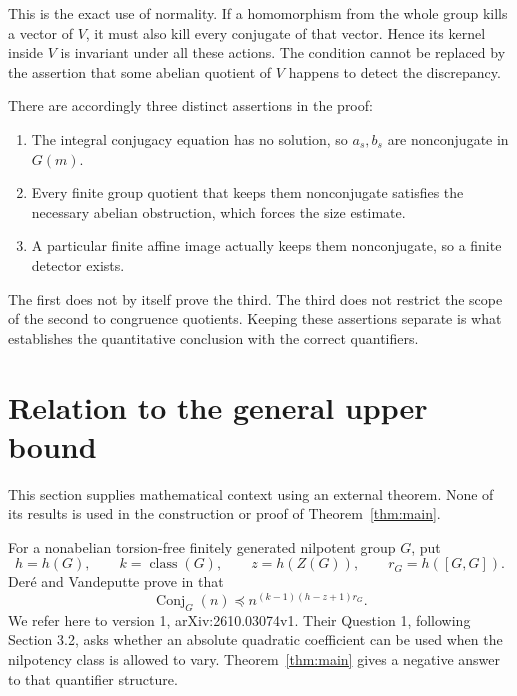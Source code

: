 \documentclass[11pt]{article}
\numberwithin{equation}{section}
\theoremstyle{definition}
\theoremstyle{remark}
\newcommand{\Conj}{\operatorname{Conj}}
\begin{document}
This is the exact use of normality. If a homomorphism from the whole group kills a vector of $V$, it must also kill every conjugate of that vector. Hence its kernel inside $V$ is invariant under all these actions. The condition cannot be replaced by the assertion that some abelian quotient of $V$ happens to detect the discrepancy.

There are accordingly three distinct assertions in the proof:
\begin{enumerate}
\item The integral conjugacy equation has no solution, so $a_s,b_s$ are nonconjugate in $G(m)$.
\item Every finite group quotient that keeps them nonconjugate satisfies the necessary abelian obstruction, which forces the size estimate.
\item A particular finite affine image actually keeps them nonconjugate, so a finite detector exists.
\end{enumerate}
The first does not by itself prove the third. The third does not restrict the scope of the second to congruence quotients. Keeping these assertions separate is what establishes the quantitative conclusion with the correct quantifiers.

\section{Relation to the general upper bound}\label{sec:context}
This section supplies mathematical context using an external theorem. None of its results is used in the construction or proof of Theorem~\ref{thm:main}.

For a nonabelian torsion-free finitely generated nilpotent group $G$, put
\[
h=h(G),\qquad k=\operatorname{class}(G),\qquad
z=h(Z(G)),\qquad r_G=h([G,G]).
\]
Der\'e and Vandeputte prove in \cite[Theorem A]{DV} that
\begin{equation}\label{eq:sourceupper}
\Conj_G(n)\preceq n^{(k-1)(h-z+1)r_G}.
\end{equation}
We refer here to version 1, arXiv:2610.03074v1. Their Question 1, following Section 3.2, asks whether an absolute quadratic coefficient can be used when the nilpotency class is allowed to vary. Theorem~\ref{thm:main} gives a negative answer to that quantifier structure.
\end{document}
